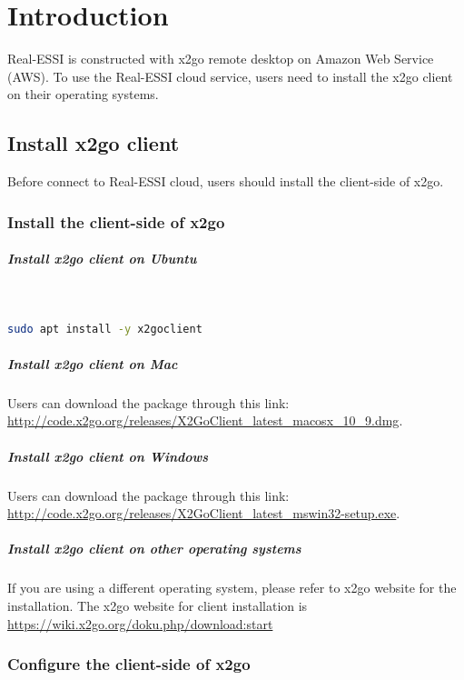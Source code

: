 \chapter{Introduction}
\label{ch_Introduction}

Real-ESSI is constructed with x2go remote desktop on Amazon Web Service (AWS).
To use the Real-ESSI cloud service, users need to install the x2go client 
on their operating systems.

\section{Install x2go client}
Before connect to Real-ESSI cloud, users should install the client-side of x2go.

\subsection{Install the client-side of x2go}
\paragraph{Install x2go client on Ubuntu} ~

\begin{lstlisting}[frame=single,language=bash]
sudo apt install -y x2goclient
\end{lstlisting}
\paragraph{Install x2go client on Mac}
Users can download the package through this link: 
\url{http://code.x2go.org/releases/X2GoClient_latest_macosx_10_9.dmg}.

\paragraph{Install x2go client on Windows}
Users can download the package through this link: 
\url{http://code.x2go.org/releases/X2GoClient_latest_mswin32-setup.exe}.

\paragraph{Install x2go client on other operating systems}
If you are using a different operating system, please refer to x2go 
website for the installation. The x2go website for client installation 
is \url{https://wiki.x2go.org/doku.php/download:start}

\subsection{Configure the client-side of x2go}

